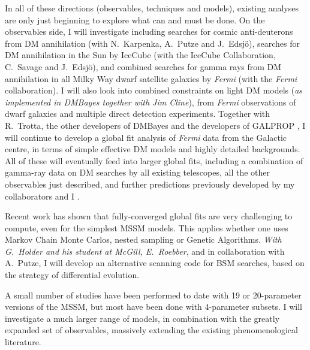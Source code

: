 \documentclass[10pt,oneside,twocolumn,a4paper]{article}
\begin{document}
In all of these directions (observables, techniques and models), existing analyses are only just beginning to explore what can and must be done.  On the observables side, I will investigate including searches for cosmic anti-deuterons from DM annihilation \cite{Hailey09,Choutko08} (with N.~Karpenka, A.~Putze and J.~Edsj\"o), searches for DM annihilation in the Sun by IceCube (with the IceCube Collaboration, C.~Savage and J.~Edsj\"o), and combined searches for gamma rays from DM annihilation in all Milky Way dwarf satellite galaxies by \textit{Fermi} (with the \textit{Fermi} collaboration).  I will also look into combined constraints on light DM models (\textit{as implemented in \textsf{DMBayes} together with Jim Cline}), from \textit{Fermi} observations of dwarf galaxies and multiple direct detection experiments.  Together with R.~Trotta, the other developers of \textsf{DMBayes} and the developers of \textsf{GALPROP} \cite{Strong98,Moskalenko98}, I will continue to develop a global fit analysis of \textit{Fermi} data from the Galactic centre, in terms of simple effective DM models and highly detailed backgrounds.  All of these will eventually feed into larger global fits, including a combination of gamma-ray data on DM searches by all existing telescopes, all the other observables just described, and further predictions previously developed by my collaborators and I \cite{Scott09c,Akrami11DD,Ripken11}.

Recent work \cite{Akrami09,SBspike} has shown that fully-converged global fits are very challenging to compute, even for the simplest MSSM models.  This applies whether one uses Markov Chain Monte Carlos, nested sampling or Genetic Algorithms.  \textit{With G.~Holder and his student at McGill, E.~Roebber}, and in collaboration with A.~Putze, I will develop an alternative scanning code for BSM searches, based on the strategy of differential evolution.

A small number of studies \cite{AbdusSalam09a,BertoneLHCDD} have been performed to date with 19 or 20-parameter versions of the MSSM, but most have been done with 4-parameter subsets.  I will investigate a much larger range of models, in combination with the greatly expanded set of observables, massively extending the existing phenomenological literature.
\end{document}
